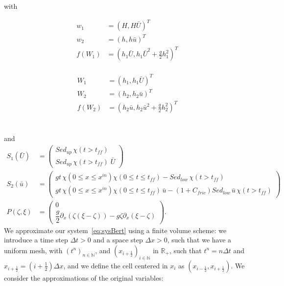 with \\
\vspace{-0.2cm}
\begin{minipage}{0.45\textwidth}
\begin{align*}
    w_1 &= (H,H\bar{U})^T \\
    w_2 &= (h,h\bar{u})^T\\
    f(W_1) &= (h_1 \bar{U}, h_1 \bar{U}^2 + \frac{g}{2} h_1^2)^T\\
\end{align*}
\end{minipage}
\hfill
\begin{minipage}{0.45\textwidth}
\begin{align*}
    W_1 &= (h_1,h_1\bar{U})^T \\
    W_2 &= (h_2, h_2\bar{u})^T\\
    f(W_2) &= (h_2 \bar{u}, h_2 \bar{u}^2 + \frac{g}{2} h_2^2)^T\\
\end{align*}
\end{minipage}\\
\vspace{-0.6cm}
and\\[-0.2cm]
\begin{align*}
    S_1(\bar{U}) & = \begin{pmatrix} Sed_{up} \, \chi(t > t_{f\!f})\\[0.1cm] Sed_{up} \, \chi(t > t_{f\!f})\; \bar{U} \end{pmatrix}\\
    S_2(\bar{u})& = \begin{pmatrix} gt\, \chi( 0 \leq x \leq x^{in})\chi( 0 \leq t \leq t_{f\!f}) - Sed_{low} \, \chi(t > t_{f\!f}) \\[0.1cm]
    gt\, \chi( 0 \leq x \leq x^{in})\chi( 0 \leq t \leq t_{f\!f}) \, \bar{u} - (1 + C_{fric})Sed_{low} \, \bar{u} \, \chi(t > t_{f\!f}) \end{pmatrix}\\
    P(\zeta,\xi) &= \begin{pmatrix} 0\\ \dfrac{g}{2} \partial_x \left(\zeta ( \xi - \zeta)\right)- g \zeta \partial_x (\xi - \zeta)\end{pmatrix}.
\end{align*}
We approximate our system~\eqref{eq:sysBert} using a finite volume scheme: we introduce a time step $\Delta t > 0$ and a space step $\Delta x > 0$, such that we have a uniform mesh, with $(t^n)_{n\in\mathbb{N}}$, and $(x_{i+\frac{1}{2}})_{i\in\mathbb{N}}$ in $\mathbb{R}_+$, such that $t^n = n \Delta t $ and $x_{i + \frac{1}{2}} = (i + \frac{1}{2}) \Delta x$, and we define the cell centered in $x_i$  as $(x_{i - \frac{1}{2}},x_{i + \frac{1}{2}})$. We consider the approximations of the original variables:
